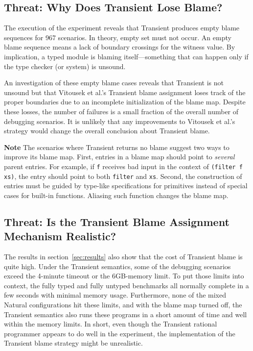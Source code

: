 \subsection{Threat: Why Does Transient Lose Blame?} \label{sec:threat:transient}

The execution of the experiment reveals that Transient produces empty blame
sequences for 967 scenarios. In theory, empty set must not occur. An empty blame
sequence means a lack of boundary crossings for the witness value.  By
implication, a typed module is blaming itself---something that can happen only
if the type checker (or system) is unsound.

An investigation of these empty blame cases reveals that Transient is not
unsound but that Vitousek et al.'s Transient blame assignment loses track
of the proper boundaries due to an incomplete initialization of the blame map.
Despite these losses, the number of failures is a small fraction of the
overall number of debugging scenarios. It is unlikely that any
improvements to Vitousek et al.'s strategy would change the overall
conclusion about Transient blame.

{\bf Note} The scenarios where Transient returns no blame suggest two ways to
improve its blame map.  First, entries in a blame map should point to {\em
several\/} parent entries.  For example, if \texttt{f} receives bad input in the
context of {\tt (filter f xs)}, the entry should point to both \texttt{filter}
and \texttt{xs}. Second, the construction of entries must be guided by type-like
specifications for primitives instead of special cases for built-in
functions. Aliasing such function changes the blame map.  


\subsection{Threat: Is the Transient Blame Assignment Mechanism Realistic?}
\label{sec:threat:transient2}

The results in section~\ref{sec:results} also show that the cost of Transient
blame is quite high. Under the Transient semantics, some of the debugging
scenarios exceed the 4-minute timeout or the 6GB-memory limit. To put those
limits into context, the fully typed and fully untyped benchmarks all normally complete
in a few seconds with minimal memory usage. Furthermore, none of the mixed
Natural configurations hit these limits, and with the blame map turned off,
the Transient semantics also runs these programs in a short amount of time and
well within the memory limits. In short, even though the Transient rational
programmer appears to do well in the experiment, the implementation of the
Transient blame strategy might be unrealistic. 

